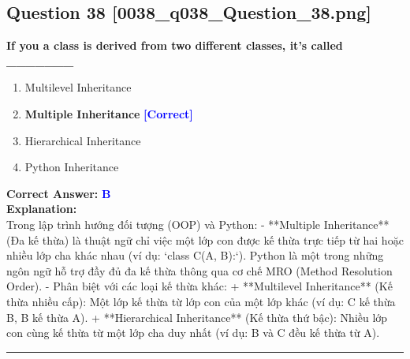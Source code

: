\documentclass[11pt,a4paper]{article}
\begin{document}
\begin{minipage}{\textwidth}
\subsection*{Question 38 \quad \footnotesize{[0038_q038_Question_38.png]}}
\noindent \textbf{If you a class is derived from two different classes, it's called _______}

\begin{enumerate}[label=\Alph*.]
    \item Multilevel Inheritance
    \item \textbf{Multiple Inheritance} \hfill \textcolor{blue}{\textbf{[Correct]}}
    \item Hierarchical Inheritance
    \item Python Inheritance
\end{enumerate}

\noindent \textbf{Correct Answer:} \textcolor{blue}{\textbf{B}} \\[4pt]
\noindent \textbf{Explanation:}\\
Trong lập trình hướng đối tượng (OOP) và Python:\newline
- **Multiple Inheritance** (Đa kế thừa) là thuật ngữ chỉ việc một lớp con được kế thừa trực tiếp từ hai hoặc nhiều lớp cha khác nhau (ví dụ: `class C(A, B):`). Python là một trong những ngôn ngữ hỗ trợ đầy đủ đa kế thừa thông qua cơ chế MRO (Method Resolution Order).\newline
- Phân biệt với các loại kế thừa khác:\newline
  + **Multilevel Inheritance** (Kế thừa nhiều cấp): Một lớp kế thừa từ lớp con của một lớp khác (ví dụ: C kế thừa B, B kế thừa A).\newline
  + **Hierarchical Inheritance** (Kế thừa thứ bậc): Nhiều lớp con cùng kế thừa từ một lớp cha duy nhất (ví dụ: B và C đều kế thừa từ A).
\end{minipage}
\vspace{0.8cm}
\hrule
\vspace{0.5cm}
\end{document}

